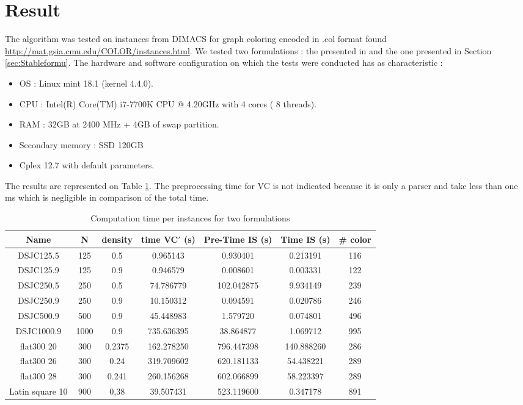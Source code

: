 \section{Result}
\label{sec:Stableres}

The algorithm was tested on instances from DIMACS for graph coloring encoded in .col format found \url{http://mat.gsia.cmu.edu/COLOR/instances.html}. We tested two formulations : the presented in \cite{PCModel} and the one presented in Section \ref{sec:Stableformu}. The hardware and software configuration on which the tests were conducted has as characteristic  :

\begin{itemize}
\item OS : Linux mint 18.1 (kernel 4.4.0).
\item CPU : Intel(R) Core(TM) i7-7700K CPU @ 4.20GHz with 4 cores ( 8 threads).
\item RAM : 32GB at 2400 MHz + 4GB of swap partition.
\item Secondary memory : SSD 120GB 
\item Cplex 12.7 with default parameters.
\end{itemize}

The results are represented on Table \ref{tbl:cpIS}. The preprocessing time for VC is not indicated because it is only a parser and take less than one ms which is negligible in comparison of the total time.

\begin{table}[H]
\centering
\begin{tabular}{|c|c|c|c|c|c|c|}
\hline
Name & N & density  & time VC$\prime$ (s) & Pre-Time IS (s) & Time IS (s) & \# color\\
\hline
DSJC125.5 & 125 & 0.5 &   0.965143 &  0.930401  & 0.213191 & 116 \\
\hline
DSJC125.9 & 125 & 0.9 &  0.946579 & 0.008601 & 0.003331 & 122 \\
\hline
DSJC250.5 & 250 & 0.5 & 74.786779  & 102.042875  & 9.934149 & 239\\ 
\hline
DSJC250.9 & 250 & 0.9 &  10.150312 & 0.094591 & 0.020786 & 246 \\
\hline
DSJC500.9 & 500 & 0.9 &  45.448983 & 1.579720 & 0.074801 & 496  \\
\hline
DSJC1000.9 & 1000 & 0.9 &  735.636395 & 38.864877 & 1.069712 & 995  \\
\hline
flat300 20 & 300 & 0,2375 &  162.278250 & 796.447398 & 140.888260 & 286 \\
\hline
flat300 26 & 300 & 0.24  &  319.709602 & 620.181133 & 54.438221 & 289 \\
\hline
flat300 28 & 300 & 0.241 &  260.156268 & 602.066899 & 58.223397 & 289 \\
\hline
Latin square 10 & 900 & 0,38 &  39.507431 & 523.119600 & 0.347178 & 891 \\
\hline
\end{tabular}
\caption{Computation time per instances for two formulations}
\label{tbl:cpIS}
\end{table}

